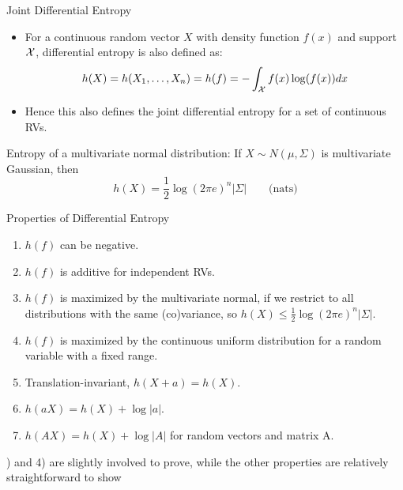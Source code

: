 \documentclass[11pt,compress,t,notes=noshow, xcolor=table]{beamer}
\begin{document}
\begin{vbframe}{Joint Differential Entropy} 
\begin{itemize}
\item For a continuous random vector $X$ with density function $f(x)$ and support $\mathcal{X}$, 
  differential entropy is also defined as:
$$ h(X) = h(X_1, \ldots, X_n) = h(f) = - \int_{\mathcal{X}} f(x) \log(f(x)) dx $$
\item Hence this also defines the joint differential entropy for a set of continuous RVs.
\end{itemize}

\lz
  
Entropy of a multivariate normal distribution: 
If $X \sim N(\mu, \Sigma)$ is multivariate Gaussian, then
  $$h(X) = \frac{1}{2} \log(2 \pi e)^n |\Sigma| \qquad \text{(nats)}$$
\end{vbframe}

\begin{vbframe}{Properties of Differential Entropy} 
\begin{enumerate}
  \item $h(f)$ can be negative.
  \item $h(f)$ is additive for independent RVs.
  \item $h(f)$ is maximized by the multivariate normal, if we restrict 
    to all distributions with the same (co)variance, so
    $h(X) \leq \frac{1}{2} \log(2 \pi e)^n |\Sigma|.$
    \item $h(f)$ is maximized by the continuous uniform distribution for a random variable with a fixed range.
\item Translation-invariant, $ h(X+a) = h(X)$. 
\item $h(aX) = h(X) + \log |a|$.
\item $h(AX) = h(X) + \log |A|$ for random vectors and matrix A.
\end{enumerate}
) and 4) are slightly involved to prove, while the other properties are relatively straightforward to show

\end{vbframe}

\endlecture
\end{document}
